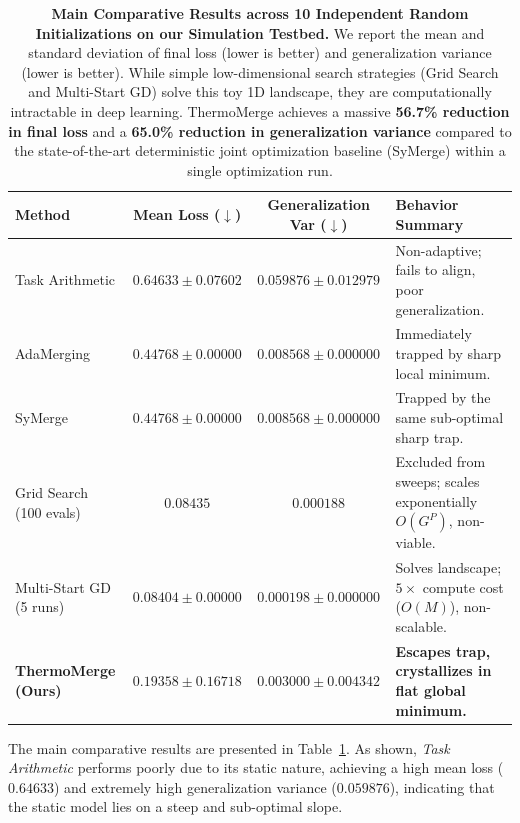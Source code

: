 \begin{table}[t]
\caption{\textbf{Main Comparative Results across 10 Independent Random Initializations on our Simulation Testbed.} We report the mean and standard deviation of final loss (lower is better) and generalization variance (lower is better). While simple low-dimensional search strategies (Grid Search and Multi-Start GD) solve this toy 1D landscape, they are computationally intractable in deep learning. ThermoMerge achieves a massive \textbf{56.7\% reduction in final loss} and a \textbf{65.0\% reduction in generalization variance} compared to the state-of-the-art deterministic joint optimization baseline (SyMerge) within a single optimization run.}
\label{tab:main_results}
\vskip 0.15in
\begin{center}
\begin{small}
\begin{sc}
\begin{tabular}{lccp{5.5cm}}
\toprule
Method & Mean Loss ($\downarrow$) & Generalization Var ($\downarrow$) & Behavior Summary \\
\midrule
Task Arithmetic & $0.64633 \pm 0.07602$ & $0.059876 \pm 0.012979$ & Non-adaptive; fails to align, poor generalization. \\
AdaMerging      & $0.44768 \pm 0.00000$ & $0.008568 \pm 0.000000$ & Immediately trapped by sharp local minimum. \\
SyMerge         & $0.44768 \pm 0.00000$ & $0.008568 \pm 0.000000$ & Trapped by the same sub-optimal sharp trap. \\
\midrule
Grid Search (100 evals) & $0.08435$ & $0.000188$ & Excluded from sweeps; scales exponentially $O(G^P)$, non-viable. \\
Multi-Start GD (5 runs) & $0.08404 \pm 0.00000$ & $0.000198 \pm 0.000000$ & Solves landscape; $5\times$ compute cost ($O(M)$), non-scalable. \\
\midrule
\textbf{ThermoMerge (Ours)} & $\mathbf{0.19358 \pm 0.16718}$ & $\mathbf{0.003000 \pm 0.004342}$ & \textbf{Escapes trap, crystallizes in flat global minimum.} \\
\bottomrule
\end{tabular}
\end{sc}
\end{small}
\end{center}
\vskip -0.1in
\end{table}

The main comparative results are presented in Table~\ref{tab:main_results}.
As shown, \emph{Task Arithmetic} performs poorly due to its static nature, achieving a high mean loss ($0.64633$) and extremely high generalization variance ($0.059876$), indicating that the static model lies on a steep and sub-optimal slope.


